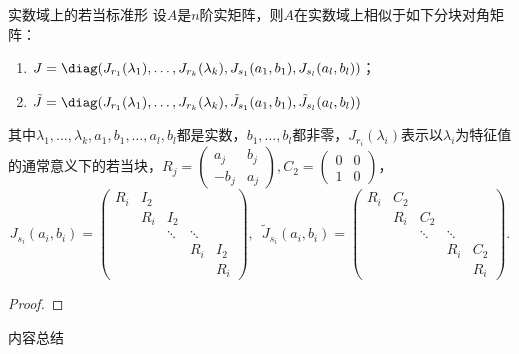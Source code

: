 \begin{theorem}{}{实数域上的若当标准形}
    设$A$是$n$阶实矩阵，则$A$在实数域上相似于如下分块对角矩阵：
    \begin{enumerate}
        \item $J=\diag(J_{r_1}(\lambda_1),\ldots,J_{r_k}(\lambda_k),J_{s_1}(a_1,b_1),J_{s_l}(a_l,b_l))$；
        \item $\tilde{J}=\diag(J_{r_1}(\lambda_1),\ldots,J_{r_k}(\lambda_k),\tilde{J}_{s_1}(a_1,b_1),\tilde{J}_{s_l}(a_l,b_l))$
    \end{enumerate}
    其中$\lambda_1,\ldots,\lambda_k,a_1,b_1,\ldots,a_l,b_l$都是实数，$b_1,\ldots,b_l$都非零，$J_{r_i}(\lambda_i)$表示以$\lambda_i$为特征值的通常意义下的若当块，$R_j=\begin{pmatrix}
            a_j & b_j \\ -b_j & a_j
        \end{pmatrix},C_2=\begin{pmatrix}
            0 & 0 \\ 1 & 0
        \end{pmatrix}$，
    \[J_{s_i}(a_i,b_i)=\begin{pmatrix}
            R_i & I_2 &        &        &     \\
                & R_i & I_2    &        &     \\
                &     & \ddots & \ddots &     \\
                &     &        & R_i    & I_2 \\
                &     &        &        & R_i
        \end{pmatrix},\enspace \tilde{J}_{s_i}(a_i,b_i)=\begin{pmatrix}
            R_i & C_2 &        &        &     \\
                & R_i & C_2    &        &     \\
                &     & \ddots & \ddots &     \\
                &     &        & R_i    & C_2 \\
                &     &        &        & R_i
        \end{pmatrix}.\]
\end{theorem}
\begin{proof}

\end{proof}

\vspace{2ex}
\centerline{\heiti \Large 内容总结}

